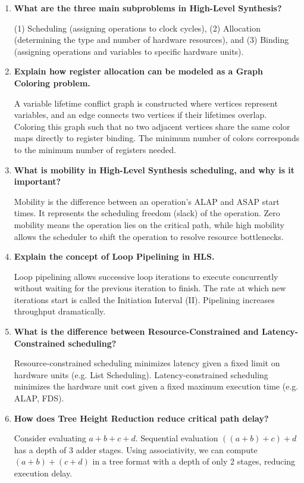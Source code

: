 \documentclass[12pt,a4paper]{article}
\newcommand{\Q}[1]{\textbf{#1}\par\noindent\ignorespaces}
\begin{document}
\vspace{6pt}

\begin{tcolorbox}[exambox, title={\textbf{Frequently Asked / Viva Questions}}]
\begin{enumerate}[leftmargin=*, topsep=0pt, label=\textbf{Q\arabic*.}, itemsep=6pt]
  \item \Q{What are the three main subproblems in High-Level Synthesis?}
        (1) Scheduling (assigning operations to clock cycles), (2) Allocation (determining the type and number of hardware resources), and (3) Binding (assigning operations and variables to specific hardware units).
        
  \item \Q{Explain how register allocation can be modeled as a Graph Coloring problem.}
        A variable lifetime conflict graph is constructed where vertices represent variables, and an edge connects two vertices if their lifetimes overlap. Coloring this graph such that no two adjacent vertices share the same color maps directly to register binding. The minimum number of colors corresponds to the minimum number of registers needed.
        
  \item \Q{What is mobility in High-Level Synthesis scheduling, and why is it important?}
        Mobility is the difference between an operation's ALAP and ASAP start times. It represents the scheduling freedom (slack) of the operation. Zero mobility means the operation lies on the critical path, while high mobility allows the scheduler to shift the operation to resolve resource bottlenecks.
        
  \item \Q{Explain the concept of Loop Pipelining in HLS.}
        Loop pipelining allows successive loop iterations to execute concurrently without waiting for the previous iteration to finish. The rate at which new iterations start is called the Initiation Interval (II). Pipelining increases throughput dramatically.
        
  \item \Q{What is the difference between Resource-Constrained and Latency-Constrained scheduling?}
        Resource-constrained scheduling minimizes latency given a fixed limit on hardware units (e.g. List Scheduling). Latency-constrained scheduling minimizes the hardware unit cost given a fixed maximum execution time (e.g. ALAP, FDS).
        
  \item \Q{How does Tree Height Reduction reduce critical path delay?}
        Consider evaluating $a+b+c+d$. Sequential evaluation $((a+b)+c)+d$ has a depth of 3 adder stages. Using associativity, we can compute $(a+b)+(c+d)$ in a tree format with a depth of only 2 stages, reducing execution delay.
        

\end{enumerate}
\end{tcolorbox}
\end{document}
